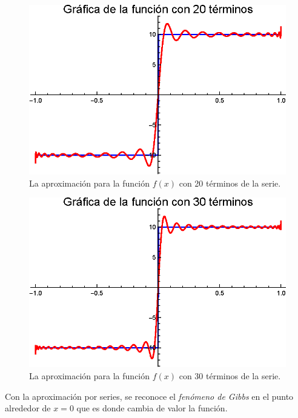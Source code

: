\begin{figure}[H]
    \centering
    \includegraphics[scale=1]{Imagenes/Expansion_Legendre_V_20.eps}
    \caption{La aproximación para la función $f (x)$ con 20 términos de la serie.}
    \label{fig:figura_plot_02}
\end{figure}
\begin{figure}[H]
    \centering
    \includegraphics[scale=1]{Imagenes/Expansion_Legendre_V_30.eps}
    \caption{La aproximación para la función $f (x)$ con 30 términos de la serie.}
    \label{fig:figura_plot_03}
\end{figure}

Con la aproximación por series, se reconoce el \emph{fenómeno de Gibbs} en el punto alrededor de $x = 0$ que es donde cambia de valor la función.



